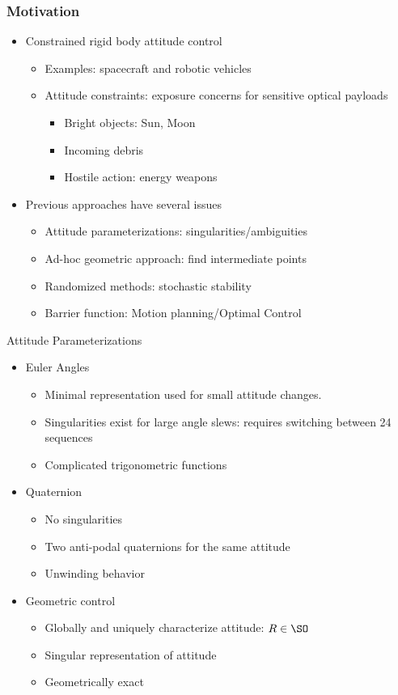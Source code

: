 \documentclass[11pt,professionalfonts]{beamer}
\begin{document}
\begin{frame} %
	\frametitle{Motivation}
	\begin{itemize}
		\item Constrained rigid body attitude control
		\begin{itemize}
			\item Examples: spacecraft and robotic vehicles
			\item Attitude constraints: exposure concerns for sensitive optical payloads
			\begin{itemize}
				\item Bright objects: Sun, Moon
				\item Incoming debris
				\item Hostile action: energy weapons
			\end{itemize}
		\end{itemize}
	\pause
	\item Previous approaches have several issues
	\begin{itemize}
		\item Attitude parameterizations: singularities/ambiguities
		\item Ad-hoc geometric approach: find intermediate points
		\item Randomized methods: stochastic stability 
		\item Barrier function: Motion planning/Optimal Control
	\end{itemize}
\end{itemize}
\end{frame} %

\begin{frame}{Attitude Parameterizations}
	\begin{itemize}
		\item Euler Angles
		\begin{itemize}
			\item Minimal representation used for small attitude changes.
			\item Singularities exist for large angle slews: requires switching between 24 sequences
			\item Complicated trigonometric functions
		\end{itemize}
		\pause
		\item Quaternion 
		\begin{itemize}
			\item No singularities
			\item Two anti-podal quaternions for the same attitude
			\item Unwinding behavior 
		\end{itemize}
		\pause
		\item Geometric control
		\begin{itemize}
			\item Globally and uniquely characterize attitude: \( R \in \SO \)
			\item Singular representation of attitude 
			\item Geometrically exact
		\end{itemize}
	\end{itemize}
	
\end{frame}
\end{document}
